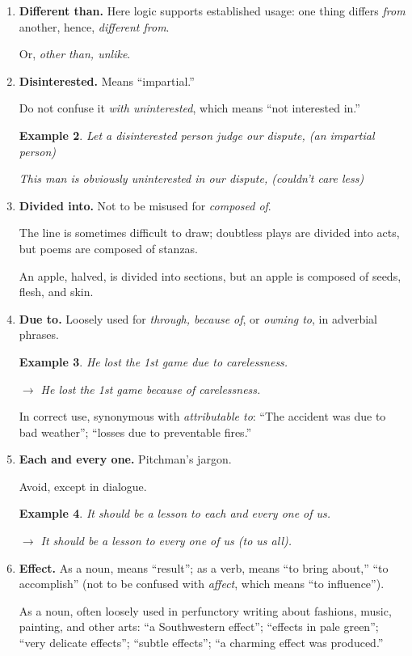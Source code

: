 \documentclass{article}
\newtheorem{example}{Example}
\begin{document}
\begin{enumerate}
\begin{example}
		$\to$ These data are misleading.
	\end{example}
	\item {\bf Different than.} Here logic supports established usage: one thing differs {\it from} another, hence, {\it different from}.
	
	Or, {\it other than, unlike}.
	\item {\bf Disinterested.} Means ``impartial.''
	
	Do not confuse it {\it with uninterested}, which means ``not interested in.''
	\begin{example}
		Let a disinterested person judge our dispute, (an impartial person)
		
		This man is obviously uninterested in our dispute, (couldn't care less)
	\end{example}
	\item {\bf Divided into.} Not to be misused for {\it composed of}.
	
	The line is sometimes difficult to draw; doubtless plays are divided into acts, but poems are composed of stanzas.
	
	An apple, halved, is divided into sections, but an apple is composed of seeds, flesh, and skin.
	\item {\bf Due to.} Loosely used for {\it through, because of}, or {\it owning to}, in adverbial phrases.
	\begin{example}
		He lost the 1st game due to carelessness.
		
		$\to$ He lost the 1st game because of carelessness.
	\end{example}
	In correct use, synonymous with {\it attributable to}: ``The accident was due to bad weather''; ``losses due to preventable fires.''
	\item {\bf Each and every one.} Pitchman's jargon.
	
	Avoid, except in dialogue.
	\begin{example}
		It should be a lesson to each and every one of us.
		
		$\to$ It should be a lesson to every one of us (to us all).
	\end{example}
	\item {\bf Effect.} As a noun, means ``result''; as a verb, means ``to bring about,'' ``to accomplish'' (not to be confused with {\it affect}, which means ``to influence'').
	
	As a noun, often loosely used in perfunctory writing about fashions, music, painting, and other arts: ``a Southwestern effect''; ``effects in pale green''; ``very delicate effects''; ``subtle effects''; ``a charming effect was produced.''
	

\end{enumerate}
\end{document}
